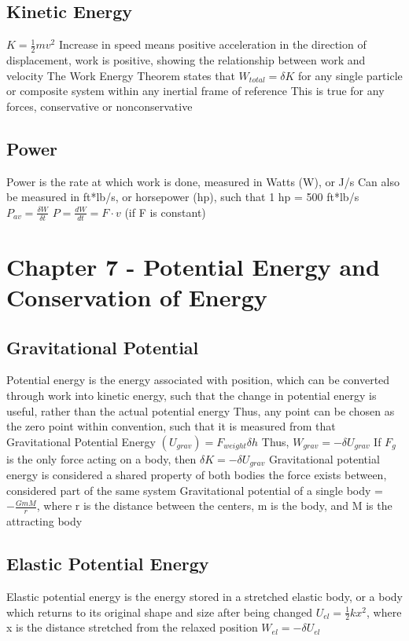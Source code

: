 \documentclass[11 pt, twoside]{article}
\newenvironment{outline*}
{
	\begin{outline}[enumerate]
	}
	{\end{outline}
}
\begin{document}
\subsection{Kinetic Energy}
\begin{outline*}
\1 $K = \frac{1}{2}mv^2$
\1 Increase in speed means positive acceleration in the direction of displacement, work is positive, showing the relationship between work and velocity
\1 The Work Energy Theorem states that $W_{total} = \delta K$ for any single particle or composite system within any inertial frame of reference
\2 This is true for any forces, conservative or nonconservative
\end{outline*}
\subsection{Power}
\begin{outline*}
\1 Power is the rate at which work is done, measured in Watts (W), or J/s
\2 Can also be measured in ft*lb/s, or horsepower (hp), such that 1 hp = 500 ft*lb/s
\1 $P_{av} = \frac{\delta W}{\delta t}$
\1 $P = \frac{dW}{dt} = F \cdot v$ (if F is constant)
\end{outline*}
\section{Chapter 7 - Potential Energy and Conservation of Energy}
\subsection{Gravitational Potential}
\begin{outline*}
\1 Potential energy is the energy associated with position, which can be converted through work into kinetic energy, such that the change in potential energy is useful, rather than the actual potential energy
\2 Thus, any point can be chosen as the zero point within convention, such that it is measured from that
\1 Gravitational Potential Energy $(U_{grav}) = F_{weight}\delta h$
\2 Thus, $W_{grav} = -\delta U_{grav}$
\2 If $F_g$ is the only force acting on a body, then $\delta K = -\delta U_{grav}$
\2 Gravitational potential energy is considered a shared property of both bodies the force exists between, considered part of the same system
\2 Gravitational potential of a single body = $-\frac{GmM}{r}$, where r is the distance between the centers, m is the body, and M is the attracting body
\end{outline*}
\subsection{Elastic Potential Energy}
\begin{outline*}
\1 Elastic potential energy is the energy stored in a stretched elastic body, or a body which returns to its original shape and size after being changed
\2 $U_{el} = \frac{1}{2}kx^2$, where x is the distance stretched from the relaxed position
\2 $W_{el} = -\delta U_{el}$
\end{outline*}
\end{document}
